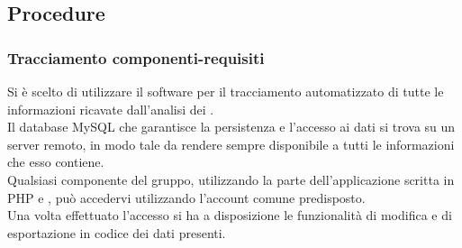 \documentclass[NormeDiProgetto.tex]{subfiles}
\begin{document}






\subsection{Procedure}

\subsubsection{Tracciamento componenti-requisiti}
	Si è scelto di utilizzare il software  per il tracciamento automatizzato di tutte le informazioni ricavate dall'analisi dei .\\
	Il database MySQL che garantisce la persistenza e l'accesso ai dati si trova su un server remoto, in modo tale da rendere sempre disponibile a tutti le informazioni che esso contiene.\\
	Qualsiasi componente del gruppo, utilizzando la parte  dell'applicazione scritta in PHP e , può accedervi utilizzando l'account comune predisposto.\\
	Una volta effettuato l'accesso si ha a disposizione le funzionalità di modifica e di esportazione in codice  dei dati presenti.\\
	
	
\end{document}
